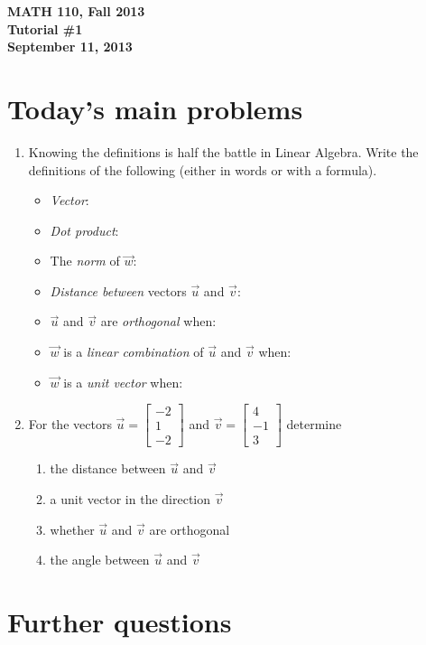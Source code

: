 \documentclass[11pt]{exam}
\newcommand{\vv}{\vspace{.2cm}}
\newcommand{\mat}[1]{\begin{bmatrix}#1\end{bmatrix}}
\newcommand{\mthCourse}{MATH 110}
\newcommand{\mthTerm}{Fall 2013}
\newcommand{\mthTutorialNumber}{1}
\newcommand{\mthDate}{September 11, 2013}
\begin{document}
{\large
	\begin{center}
		{\bf \mthCourse, \mthTerm}\\ 
		{\bf Tutorial \#\mthTutorialNumber}\\
		{\bf \mthDate}
	\end{center}
}

\section*{Today's main problems}
\begin{enumerate}
	\item Knowing the definitions is half the battle in Linear Algebra.
	Write the definitions of the following (either in words or with a formula).
	\begin{itemize}
		\item  \emph{Vector}: \vv\vv\vv
		\item  \emph{Dot product}: \vv\vv\vv
		\item  The \emph{norm} of $\vec w$: \vv\vv\vv
		\item  \emph{Distance between} vectors $\vec u$ and $\vec v$: \vv\vv\vv
		\item  $\vec u$ and $\vec v$ are \emph{orthogonal} when: \vv\vv\vv
		\item  $\vec w$ is a \emph{linear combination} of $\vec u$ and $\vec v$ when: \vv\vv\vv
		\item  $\vec w$ is a \emph{unit vector} when: \vv\vv\vv
	\end{itemize}

	\item For the vectors $\vec u=\mat{-2\\1\\-2}$ and $\vec v=\mat{4\\-1\\3}$ determine
	\begin{enumerate}
		\item the distance between $\vec u$ and $\vec v$
		\item a unit vector in the direction $\vec v$
		\item whether $\vec u$ and $\vec v$ are orthogonal
		\item the angle between $\vec u$ and $\vec v$
	\end{enumerate}
\end{enumerate}


\section*{Further questions}
\end{document}
